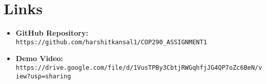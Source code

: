 \documentclass[12pt,letterpaper,onecolumn]{exam}
\begin{document}
\section{Links}

\begin{itemize}
    \item \textbf{GitHub Repository:} \texttt{https://github.com/harshitkansal1/COP290\_ASSIGNMENT1} 
    \item \textbf{Demo Video:} \texttt{https://drive.google.com/file/d/1VusTPBy3CbtjRWGqhfjJG4QP7oZc6BeN/view?usp=sharing} 
\end{itemize}

\pagestyle{plain}
\end{document}
